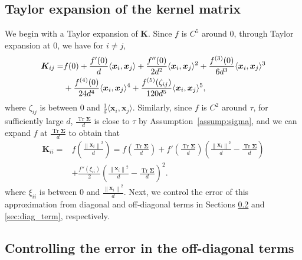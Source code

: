 \documentclass[twoside,11pt]{article}
\newcommand{\norm}[1]{\left\|#1\right\|}
\def\bK{{\boldsymbol K}}
\def\bx{{\boldsymbol x}}
\def\bSigma{{\boldsymbol \Sigma}}
\renewcommand{\bK}{\boldsymbol{K}}
\newcommand{\Tr}{\operatorname{Tr}}
\newcommand{\x}{\boldsymbol{x}}
\newcommand{\1}{\mathbf{1}}
\begin{document}
\subsection{Taylor expansion of the kernel matrix}\label{sec:taylor}

We begin with a Taylor expansion of $\bK$. Since $f$ is $C^5$ around $0$,   through Taylor expansion at $0$, we have for $i\not=j$,
\begin{align}\label{eq:taylor_off}
\bK_{ij}=&f(0)+\frac{f'(0)}{d}\langle \bx_i,\bx_j\rangle+ \frac{f''(0)}{2d^2}\langle \bx_i,\bx_j\rangle^2 +\frac{f^{(3)}(0)}{6d^3}\langle \bx_i,\bx_j\rangle^3 \notag \\
&+\frac{f^{(4)}(0)}{24d^4}\langle \bx_i,\bx_j\rangle^4+\frac{f^{(5)}(\zeta_{ij})}{120d^5}\langle \bx_i,\bx_j\rangle^5,
\end{align}
where $\zeta_{ij}$ is between $0$ and $\frac{1}{d}\langle \bx_i, \bx_j\rangle$.  Similarly, since $f$ is $C^2$ around $\tau$, for sufficiently large $d$, $\frac{\Tr\bSigma}{d}$ is close to $\tau$ by Assumption~\ref{assump:sigma}, and  we can expand $f$ at $\frac{\Tr\bSigma}{d}$ to obtain that
\begin{align}\label{eq:taylor_diag}
    \bK_{ii}=&f\left( \frac{\norm{\bx_i}^2}{d}\right)=f\left(\frac{\Tr\bSigma}{d}\right)+f'\left( \frac{\Tr\bSigma}{d}\right)\left( \frac{\norm{\bx_i}^2}{d}-\frac{\Tr\bSigma}{d}\right)\\
    &+\frac{f''(\xi_{ii})}{2}\left( \frac{\norm{\bx_i}^2}{d}-\frac{\Tr\bSigma}{d}\right)^2.
\end{align}
where $\xi_{ii}$ is between $0$ and $\frac{\norm{\x_i}^2}{d}$. Next, we control the error of this approximation from diagonal and off-diagonal terms in Sections \ref{sec:off_diagonal_term} and \ref{sec:diag_term}, respectively.

\subsection{Controlling the error in the off-diagonal terms}\label{sec:off_diagonal_term}
\end{document}
